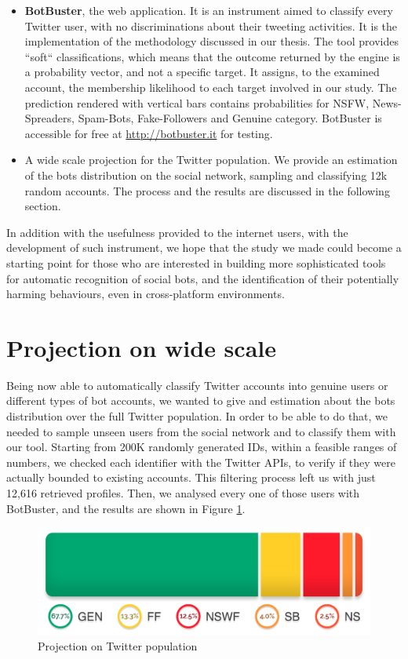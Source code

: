 \begin{itemize}
	\item[\PencilRight] \textbf{BotBuster}, the web application. It is an instrument aimed to classify every Twitter user, with no discriminations about their tweeting activities. It is the implementation of the methodology discussed in our thesis. The tool provides ``soft`` classifications, which means that the outcome returned by the engine is a probability vector, and not a specific target. It assigns, to the examined account, the membership likelihood to each target involved in our study.
	The prediction rendered with vertical bars contains probabilities for NSFW, News-Spreaders, Spam-Bots, Fake-Followers and Genuine category.
	BotBuster is accessible for free at \url{http://botbuster.it} for testing.
	
	\item[\PencilRight] A wide scale projection for the Twitter population.
	We provide an estimation of the bots distribution on the social network, sampling and classifying 12k random accounts. The process and the results are discussed in the following section.
\end{itemize}

In addition with the usefulness provided to the internet users, with the development of such instrument, we hope that the study we made could become a starting point for those who are interested in building more sophisticated tools for automatic recognition of social bots, and the identification of their potentially harming behaviours, even in cross-platform environments.

\section{Projection on wide scale}
Being now able to automatically classify Twitter accounts into genuine users or different types of bot accounts, we wanted to give and estimation about the bots distribution over the full Twitter population. In order to be able to do that, we needed to sample unseen users from the social network and to classify them with our tool.
Starting from 200K randomly generated IDs, within a feasible ranges of numbers, we checked each identifier with the Twitter APIs, to verify if they were actually bounded to existing accounts.
This filtering process left us with just 12,616 retrieved profiles.
Then, we analysed every one of those users with BotBuster, and the results are shown in Figure \ref{fig:projection}.
\begin{figure}[htp!]
	\begin{center}
		\includegraphics[width=\columnwidth]{chapter8/figure/projection.png}
	\end{center}
	\caption{Projection on Twitter population}
	\label{fig:projection}
\end{figure}

